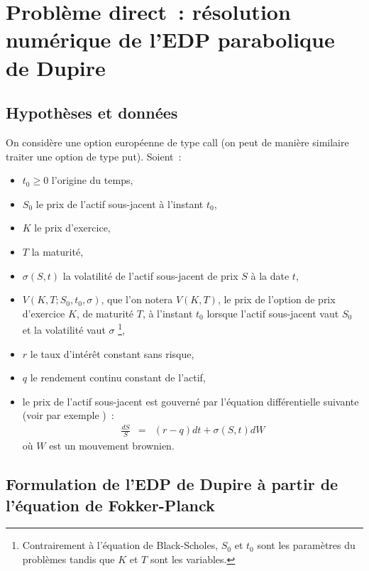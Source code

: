 \section{Probl\`eme direct~: r\'esolution num\'erique de l'EDP 
parabolique de Dupire}
\label{SEC:PB_DIRECT}

\subsection{Hypoth\`eses et donn\'ees}

On consid\`ere une option europ\'eenne de type call (on peut de 
mani\`ere similaire traiter une option de type put). Soient~: 
\begin{itemize}
\item $t_0 \geq 0$ l'origine du temps,
\item $S_0$ le prix de l'actif sous-jacent \`a l'instant $t_0$,
\item $K$ le prix d'exercice,
\item $T$ la maturit\'e,
\item $\sigma(S,t)$ la volatilit\'e de l'actif sous-jacent de prix 
$S$ \`a la date $t$,
\item $V(K,T;S_0,t_0,\sigma)$, que l'on notera $V(K,T)$, le prix de 
l'option de prix d'exercice $K$, de maturit\'e $T$, \`a l'instant 
$t_0$ lorsque l'actif sous-jacent vaut $S_0$ et la volatilit\'e vaut 
$\sigma$ \footnote{Contrairement \`a l'\'equation de Black-Scholes, 
$S_0$ et $t_0$ sont les param\`etres du probl\`emes tandis que $K$ 
et $T$ sont les variables.},
\item $r$ le taux d'int\'er\^et constant sans risque,
\item $q$ le rendement continu constant de l'actif,
\item le prix de l'actif sous-jacent est gouvern\'e par l'\'equation 
diff\'erentielle suivante (voir par exemple \cite{bla:jpe:73})~:
\begin{eqnarray}
\frac{dS}{S} &=& (r-q)dt + \sigma(S,t)dW
\end{eqnarray}
o\`u $W$ est un mouvement brownien.
\end{itemize}

\subsection{Formulation de l'EDP de Dupire \`a partir de 
l'\'equation de Fokker-Planck}

